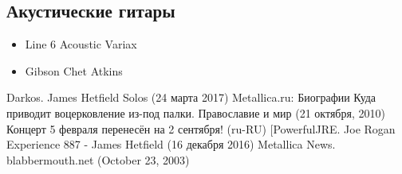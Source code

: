 \documentclass[a4paper,12pt,leqno]{article}
\theoremstyle{plain} %
\theoremstyle{definition} %
\theoremstyle{remark} %
\begin{document}
\subsection{Акустические гитары}

\begin{itemize}
	\item Line 6 Acoustic Variax
	\item Gibson Chet Atkins
\end{itemize}

\begin{thebibliography}{6}	
	  Darkos. James Hetfield Solos (24 марта 2017)
	 Metallica.ru: Биографии
	 Куда приводит воцерковление из-под палки. Православие и мир (21 октября, 2010)
	 Концерт 5 февраля перенесён на 2 сентября! (ru-RU)
	 [PowerfulJRE. Joe Rogan Experience 887 - James Hetfield (16 декабря 2016)
	 Metallica News. blabbermouth.net (October 23, 2003)	
\end{thebibliography}
\end{document}
